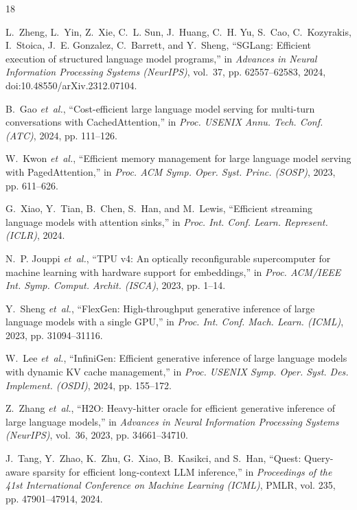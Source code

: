 \documentclass[conference,10pt]{IEEEtran}
\begin{document}

\begin{thebibliography}{18}

L.~Zheng, L.~Yin, Z.~Xie, C.~L. Sun, J.~Huang, C.~H. Yu, S.~Cao, C.~Kozyrakis, I.~Stoica, J.~E. Gonzalez, C.~Barrett, and Y.~Sheng, ``{SGLang}: Efficient execution of structured language model programs,'' in \emph{Advances in Neural Information Processing Systems (NeurIPS)}, vol.~37, pp. 62557--62583, 2024, doi:10.48550/arXiv.2312.07104.

B.~Gao \emph{et~al.}, ``Cost-efficient large language model serving for multi-turn conversations with {CachedAttention},'' in \emph{Proc. USENIX Annu. Tech. Conf. (ATC)}, 2024, pp. 111--126.

W.~Kwon \emph{et~al.}, ``Efficient memory management for large language model serving with {PagedAttention},'' in \emph{Proc. ACM Symp. Oper. Syst. Princ. (SOSP)}, 2023, pp. 611--626.

G.~Xiao, Y.~Tian, B.~Chen, S.~Han, and M.~Lewis, ``Efficient streaming language models with attention sinks,'' in \emph{Proc. Int. Conf. Learn. Represent. (ICLR)}, 2024.

N.~P. Jouppi \emph{et~al.}, ``{TPU v4}: An optically reconfigurable supercomputer for machine learning with hardware support for embeddings,'' in \emph{Proc. ACM/IEEE Int. Symp. Comput. Archit. (ISCA)}, 2023, pp. 1--14.

Y.~Sheng \emph{et~al.}, ``{FlexGen}: High-throughput generative inference of large language models with a single {GPU},'' in \emph{Proc. Int. Conf. Mach. Learn. (ICML)}, 2023, pp. 31094--31116.

W.~Lee \emph{et~al.}, ``{InfiniGen}: Efficient generative inference of large language models with dynamic {KV} cache management,'' in \emph{Proc. USENIX Symp. Oper. Syst. Des. Implement. (OSDI)}, 2024, pp. 155--172.

Z.~Zhang \emph{et~al.}, ``{H2O}: Heavy-hitter oracle for efficient generative inference of large language models,'' in \emph{Advances in Neural Information Processing Systems (NeurIPS)}, vol.~36, 2023, pp. 34661--34710.

J.~Tang, Y.~Zhao, K.~Zhu, G.~Xiao, B.~Kasikci, and S.~Han, ``{Quest}: Query-aware sparsity for efficient long-context {LLM} inference,'' in \emph{Proceedings of the 41st International Conference on Machine Learning (ICML)}, PMLR, vol. 235, pp. 47901--47914, 2024.


\end{thebibliography}
\end{document}
